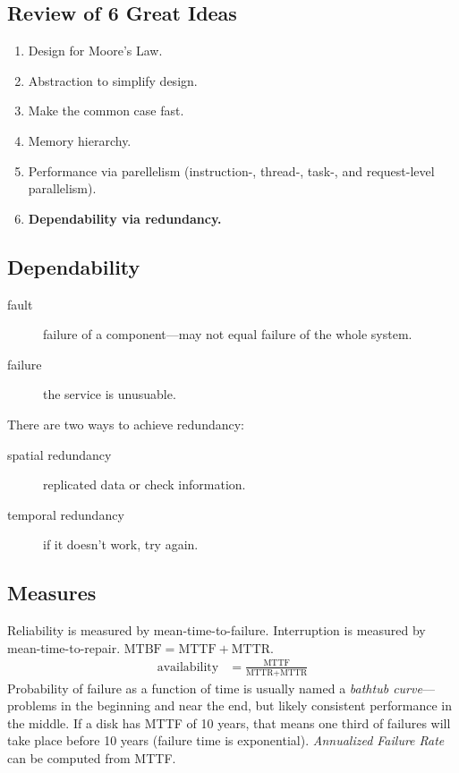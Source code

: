 \subsection{Review of 6 Great Ideas}
\begin{enumerate}
	\item Design for Moore's Law.
	\item Abstraction to simplify design.
	\item Make the common case fast.
	\item Memory hierarchy.
	\item Performance via parellelism (instruction-, thread-, task-, and request-level parallelism).
	\item \textbf{Dependability via redundancy.}
\end{enumerate}

\subsection{Dependability}
\begin{description}
	\item[fault] failure of a component---may not equal failure of the whole system.
	\item[failure] the service is unusuable.
\end{description}
There are two ways to achieve redundancy:
\begin{description}
	\item[spatial redundancy] replicated data or check information.
	\item[temporal redundancy] if it doesn't work, try again.
\end{description}

\subsection{Measures}
Reliability is measured by mean-time-to-failure. Interruption is measured by mean-time-to-repair. \(\text{MTBF} = \text{MTTF} + \text{MTTR}\).
\begin{align}
\text{availability} &= \frac{\text{MTTF}}{\text{MTTR} + \text{MTTR}}
\end{align}
Probability of failure as a function of time is usually named a \emph{bathtub curve}---problems in the beginning and near the end, but likely consistent performance in the middle.
If a disk has MTTF of 10 years, that means one third of failures will take place before 10 years (failure time is exponential).
\emph{Annualized Failure Rate} can be computed from MTTF.

